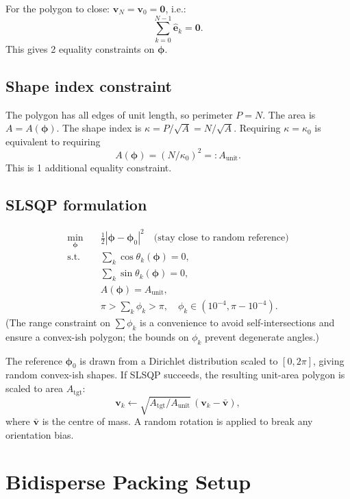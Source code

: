 \documentclass[12pt]{article}
\begin{document}
For the polygon to close: $\mathbf{v}_N = \mathbf{v}_0 = \mathbf{0}$, i.e.:
\[
  \sum_{k=0}^{N-1} \hat{\mathbf{e}}_k = \mathbf{0}.
\]
This gives 2 equality constraints on $\boldsymbol{\phi}$.

\subsection{Shape index constraint}

The polygon has all edges of unit length, so perimeter $P = N$.  The area is
$A = A(\boldsymbol{\phi})$.  The shape index is $\kappa = P/\sqrt{A} = N/\sqrt{A}$.
Requiring $\kappa = \kappa_0$ is equivalent to requiring
\[
  A(\boldsymbol{\phi}) = (N/\kappa_0)^2 =: A_{\mathrm{unit}}.
\]
This is 1 additional equality constraint.

\subsection{SLSQP formulation}

\begin{align*}
  \min_{\boldsymbol{\phi}} \quad & \tfrac{1}{2}|\boldsymbol{\phi} - \boldsymbol{\phi}_0|^2
    \quad\text{(stay close to random reference)} \\
  \text{s.t.} \quad
  & \sum_k \cos\theta_k(\boldsymbol{\phi}) = 0, \\
  & \sum_k \sin\theta_k(\boldsymbol{\phi}) = 0, \\
  & A(\boldsymbol{\phi}) = A_{\mathrm{unit}}, \\
  & \pi > \sum_k \phi_k > \pi, \quad \phi_k \in (10^{-4}, \pi - 10^{-4}).
\end{align*}
(The range constraint on $\sum \phi_k$ is a convenience to avoid self-intersections
and ensure a convex-ish polygon; the bounds on $\phi_k$ prevent degenerate angles.)

The reference $\boldsymbol{\phi}_0$ is drawn from a Dirichlet distribution scaled to
$[0, 2\pi]$, giving random convex-ish shapes.  If SLSQP succeeds, the resulting
unit-area polygon is scaled to area $A_{\mathrm{tgt}}$:
\[
  \mathbf{v}_k \leftarrow \sqrt{A_{\mathrm{tgt}}/A_{\mathrm{unit}}}\,(\mathbf{v}_k - \bar{\mathbf{v}}),
\]
where $\bar{\mathbf{v}}$ is the centre of mass.  A random rotation is applied to
break any orientation bias.

\section{Bidisperse Packing Setup}
\end{document}
